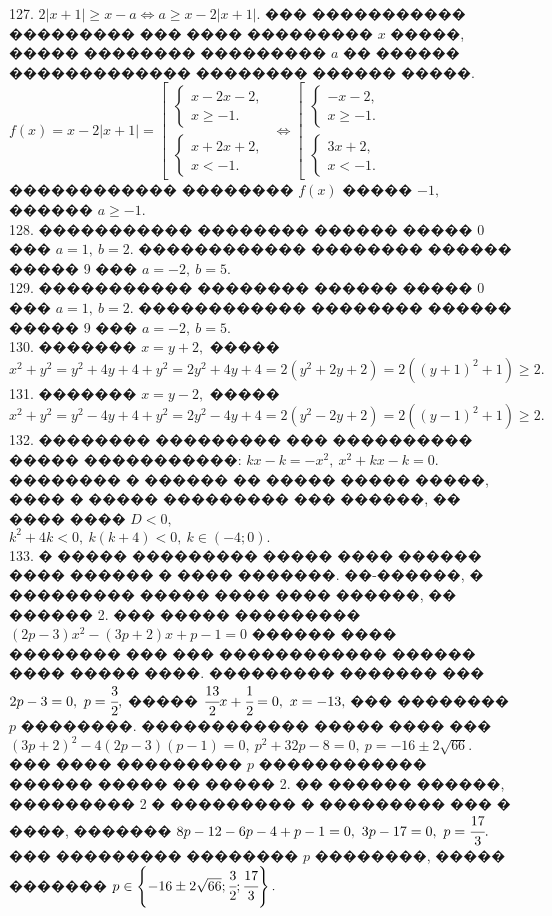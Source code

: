 \documentclass[12pt]{article}
\begin{document}
127. $2|x+1|\geqslant x-a\Leftrightarrow a\geqslant  x-2|x+1|.$ ��� ����������� ��������� ��� ���� ��������� $x$ �����, ����� �������� ��������� $a$ �� ������ ������������� �������� ������ �����. $f(x)=x-2|x+1|=\left[\begin{array}{l}\begin{cases}x-2x-2,\\ x\geqslant -1. \end{cases}\\ \begin{cases}x+2x+2,\\ x< -1. \end{cases}\end{array}\right.\Leftrightarrow\left[\begin{array}{l}\begin{cases}-x-2,\\ x\geqslant -1. \end{cases}\\ \begin{cases}3x+2,\\ x<-1. \end{cases}\end{array}\right.$ ������������ �������� $f(x)$ ����� $-1,$ ������ $a\geqslant-1.$\\
128. ����������� �������� ������ ����� 0 ��� $a=1,\ b=2.$ ������������ �������� ������ ����� 9 ��� $a=-2,\ b=5.$\\
129. ����������� �������� ������ ����� 0 ��� $a=1,\ b=2.$ ������������ �������� ������ ����� 9 ��� $a=-2,\ b=5.$\\
130. ������� $x=y+2,$ ����� $x^2+y^2=y^2+4y+4+y^2=2y^2+4y+4=2(y^2+2y+2)=2((y+1)^2+1)\geqslant2.$\\
131. ������� $x=y-2,$ ����� $x^2+y^2=y^2-4y+4+y^2=2y^2-4y+4=2(y^2-2y+2)=2((y-1)^2+1)\geqslant2.$\\
132. �������� ��������� ��� ���������� ����� �����������: $kx-k=-x^2,\ x^2+kx-k=0.$ �������� � ������ �� ����� ����� �����, ���� � ����� ��������� ��� ������, �� ���� ���� $D<0,$\\ $k^2+4k<0,\ k(k+4)<0,\ k\in(-4;0).$\\
133. � ����� ��������� ����� ���� ������ ���� ������ � ���� �������. ��-������, � ��������� ����� ���� ���� ������, �� ������ 2. ��� ����� ��������� $(2p-3)x^2-(3p+2)x+p-1=0$ ������ ���� �������� ��� ��� ������������ ������ ���� ����� ����. ��������� ������� ��� $2p-3=0,\ p=\cfrac{3}{2},$ ����� $\cfrac{13}{2}x+\cfrac{1}{2}=0,\ x=-13,$ ��� �������� $p$ ��������. ������������ ����� ���� ��� $(3p+2)^2-4(2p-3)(p-1)=0,\ p^2+32p-8=0,\ p=-16\pm2\sqrt{66}.$ ��� ���� ��������� $p$ ������������ ������ ����� �� ����� 2. �� ������ ������, ��������� 2 � ��������� � ��������� ��� � ����, ������� $8p-12-6p-4+p-1=0,\ 3p-17=0,\ p=\cfrac{17}{3}.$ ��� ��������� �������� $p$ ��������, ����� ������� $p\in\left\{-16\pm2\sqrt{66};\cfrac{3}{2};\cfrac{17}{3}\right\}.$\\
\end{document}
